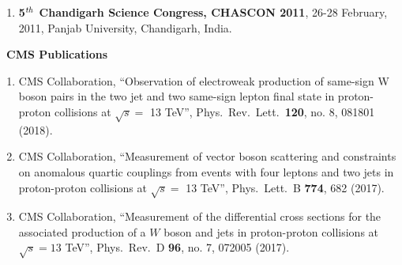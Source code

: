 \begin{itemize}
\begin{enumerate}
\item {\bf 5$^{\it th}$ Chandigarh Science Congress, CHASCON 2011}, 26-28 February, 2011, Panjab University, Chandigarh, India.
\end{enumerate}
\vspace*{3mm}
{\Large \item {\bf ~CMS Publications}}\protect\footnotemark
{}
\begin{enumerate}

\item CMS Collaboration, ``Observation of electroweak production of same-sign W boson pairs in the two jet and two same-sign lepton final state in proton-proton collisions at $\sqrt{s} = $ 13 TeV'', Phys.\ Rev.\ Lett.\  {\bf 120}, no. 8, 081801 (2018).

\item CMS Collaboration, ``Measurement of vector boson scattering and constraints on anomalous quartic couplings from events with four leptons and two jets in proton-proton collisions at $\sqrt{s}=$ 13 TeV'', Phys.\ Lett.\ B {\bf 774}, 682 (2017).

\item CMS Collaboration, ``Measurement of the differential cross sections for the associated production of a $W$ boson and jets in proton-proton collisions at $\sqrt{s}=13$ TeV'', Phys.\ Rev.\ D {\bf 96}, no. 7, 072005 (2017).


\end{enumerate}
\end{itemize}
